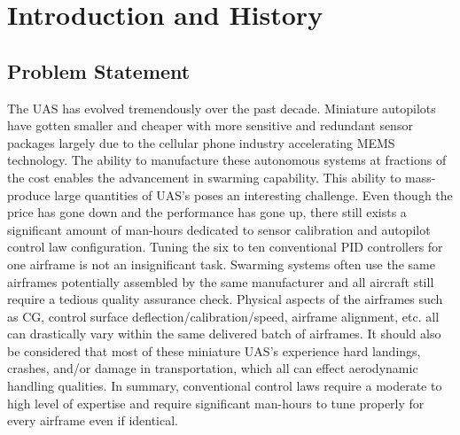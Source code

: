 \chapter{Introduction and History}\label{ch:intro}


\section{Problem Statement}
The \ac{UAS} has evolved tremendously over the past decade.  Miniature autopilots have gotten smaller and cheaper with more sensitive and redundant sensor packages largely due to the cellular phone industry accelerating \ac{MEMS} technology.  The ability to manufacture these autonomous systems at fractions of the cost enables the advancement in swarming capability.  This ability to mass-produce large quantities of \ac{UAS}'s poses an interesting challenge.  Even though the price has gone down and the performance has gone up, there still exists a significant amount of man-hours dedicated to sensor calibration and autopilot control law configuration.  Tuning the six to ten conventional \ac{PID} controllers for one airframe is not an insignificant task.  Swarming systems often use the same airframes potentially assembled by the same manufacturer and all aircraft still require a tedious quality assurance check.  Physical aspects of the airframes such as \ac{CG}, control surface deflection/calibration/speed, airframe alignment, etc. all can drastically vary within the same delivered batch of airframes.  It should also be considered that most of these miniature \ac{UAS}'s experience hard landings, crashes, and/or damage in transportation, which all can effect aerodynamic handling qualities.  In summary, conventional control laws require a moderate to high level of expertise and require significant man-hours to tune properly for every airframe even if identical.  

